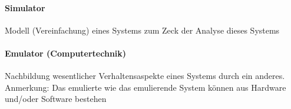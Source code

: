 \paragraph{Simulator}
Modell (Vereinfachung) eines Systems zum Zeck der Analyse dieses Systems 

\paragraph{Emulator (Computertechnik)}
Nachbildung wesentlicher Verhaltensaspekte eines Systems durch ein anderes. Anmerkung: Das emulierte wie das emulierende System können aus Hardware und/oder Software bestehen







